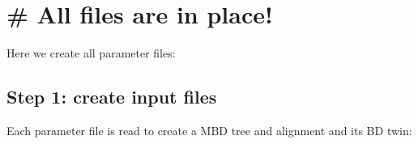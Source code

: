 \documentclass[]{article}
\newenvironment{Shaded}{\begin{snugshade}}{\end{snugshade}}
\newcommand{\KeywordTok}[1]{\textcolor[rgb]{0.13,0.29,0.53}{\textbf{#1}}}
\newcommand{\DecValTok}[1]{\textcolor[rgb]{0.00,0.00,0.81}{#1}}
\newcommand{\StringTok}[1]{\textcolor[rgb]{0.31,0.60,0.02}{#1}}
\newcommand{\ControlFlowTok}[1]{\textcolor[rgb]{0.13,0.29,0.53}{\textbf{#1}}}
\newcommand{\OperatorTok}[1]{\textcolor[rgb]{0.81,0.36,0.00}{\textbf{#1}}}
\newcommand{\NormalTok}[1]{#1}
\begin{document}
\section{}\label{section-8}

\section{\# All files are in place!}\label{all-files-are-in-place}

Here we create all parameter files:

\begin{Shaded}
\end{Shaded}

\subsection{Step 1: create input files}\label{step-1-create-input-files}

Each parameter file is read to create a MBD tree and alignment and its
BD twin:
\end{document}
